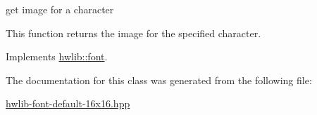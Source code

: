 get image for a character 

This function returns the image for the specified character. 

Implements \hyperlink{classhwlib_1_1font_ab292f5c14db5727c2ef67cfa8df4e88d}{hwlib\+::font}.



The documentation for this class was generated from the following file\+:\begin{DoxyCompactItemize}
\item 
\hyperlink{hwlib-font-default-16x16_8hpp}{hwlib-\/font-\/default-\/16x16.\+hpp}\end{DoxyCompactItemize}

